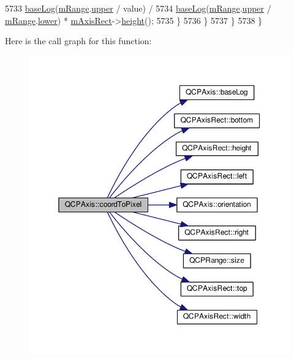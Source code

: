 \begin{DoxyCode}
5733                  \hyperlink{class_q_c_p_axis_a1385765db2419ee5fb5505a6cf9130fb}{baseLog}(\hyperlink{class_q_c_p_axis_a1ee36773c49062d751560e11f90845f7}{mRange}.\hyperlink{class_q_c_p_range_ae44eb3aafe1d0e2ed34b499b6d2e074f}{upper} / value) /
5734                      \hyperlink{class_q_c_p_axis_a1385765db2419ee5fb5505a6cf9130fb}{baseLog}(\hyperlink{class_q_c_p_axis_a1ee36773c49062d751560e11f90845f7}{mRange}.\hyperlink{class_q_c_p_range_ae44eb3aafe1d0e2ed34b499b6d2e074f}{upper} / \hyperlink{class_q_c_p_axis_a1ee36773c49062d751560e11f90845f7}{mRange}.\hyperlink{class_q_c_p_range_aa3aca3edb14f7ca0c85d912647b91745}{lower}) * 
      \hyperlink{class_q_c_p_axis_a6f150b65a202f32936997960e331dfcb}{mAxisRect}->\hyperlink{class_q_c_p_axis_rect_a1c55c4f3bef40cf01b21820316c8469e}{height}();
5735       \}
5736     \}
5737   \}
5738 \}
\end{DoxyCode}


Here is the call graph for this function\+:\nopagebreak
\begin{figure}[H]
\begin{center}
\leavevmode
\includegraphics[width=350pt]{class_q_c_p_axis_a985ae693b842fb0422b4390fe36d299a_cgraph}
\end{center}
\end{figure}




